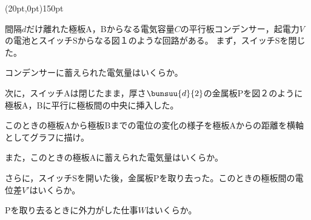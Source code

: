 \hakosyokika
\item
    \begin{mawarikomi}(20pt,0pt){150pt}{
        
        
        }
        間隔$d$だけ離れた極板A，Bからなる電気容量$C$の平行板コンデンサー，起電力$V$の電池とスイッチSからなる図１のような回路がある。
        まず，スイッチSを閉じた。
        \begin{Enumerate}
            \item コンデンサーに蓄えられた電気量はいくらか。
        \end{Enumerate}
        次に，スイッチAは閉じたまま，厚さ$\bunsuu{d}{2}$の金属板Pを図２のように極板A，Bに平行に極板間の中央に挿入した。
        \begin{Enumerate*}
            \item このときの極板Aから極板Bまでの電位の変化の様子を極板Aからの距離を横軸としてグラフに描け。
            \item また，このときの極板Aに蓄えられた電気量はいくらか。
            \item さらに，スイッチSを開いた後，金属板Pを取り去った。このときの極板間の電位差$V'$はいくらか。
            \item Pを取り去るときに外力がした仕事$W$はいくらか。
        \end{Enumerate*}
    \end{mawarikomi}
